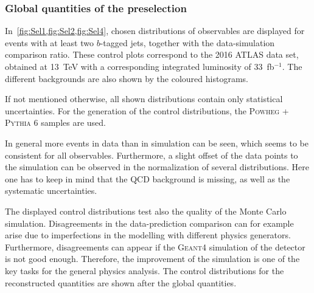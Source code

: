 \subsubsection{Global quantities of the preselection}

In~\cref{fig:Sel1,fig:Sel2,fig:Sel4}, chosen distributions of observables are displayed for events with at least two $b$-tagged jets, together with the data-simulation comparison ratio. These control plots correspond to the  2016 ATLAS data set, obtained at 13~TeV with a corresponding integrated luminosity of 33~fb$^{-1}$. The different backgrounds are also shown by the coloured histograms. 

If not mentioned otherwise, all shown distributions contain only statistical uncertainties.
 For the generation of  the control distributions, the \textsc{Powheg} + \textsc{Pythia 6} samples are used.

In general more events in data than in simulation can be seen, which seems to be consistent for all observables. Furthermore, a slight offset of the data points to the simulation can be observed in the normalization of several distributions.    
Here one has to keep in mind that the QCD background is missing, as well as the systematic uncertainties.


The displayed control distributions test also the quality of the Monte Carlo simulation.
Disagreements in the data-prediction comparison can for example  arise due to imperfections in the  modelling  with different physics generators. Furthermore, disagreements can appear if the \textsc{Geant4} simulation of the detector is not good enough. Therefore, the improvement of the simulation is one of the key tasks for the general physics analysis. 
The control distributions for the reconstructed quantities are shown after the global quantities.





\clearpage

